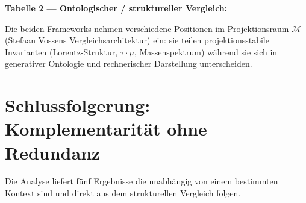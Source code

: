 \textbf{Tabelle 2 — Ontologischer / struktureller Vergleich:}

\begin{center}
\renewcommand{\arraystretch}{1.4}
{\small
{}
}
\end{center}

Die beiden Frameworks nehmen verschiedene Positionen im Projektionsraum
$\mathcal{M}$ (Stefaan Vossens Vergleichsarchitektur) ein: sie teilen
projektionsstabile Invarianten (Lorentz-Struktur, $\tau\cdot\mu$,
Massenspektrum) während sie sich in generativer Ontologie und rechnerischer
Darstellung unterscheiden.

\section{Schlussfolgerung: Komplementarität ohne Redundanz}

Die Analyse liefert fünf Ergebnisse die unabhängig von einem bestimmten
Kontext sind und direkt aus dem strukturellen Vergleich folgen.

